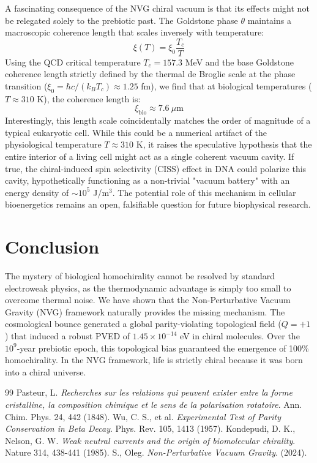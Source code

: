 \documentclass[12pt,a4paper]{article}
\begin{document}
A fascinating consequence of the NVG chiral vacuum is that its effects might not be relegated solely to the prebiotic past. The Goldstone phase $\theta$ maintains a macroscopic coherence length that scales inversely with temperature:
\begin{equation}
    \xi(T) = \xi_0 \frac{T_c}{T}
\end{equation}
Using the QCD critical temperature $T_c = 157.3$ MeV and the base Goldstone coherence length strictly defined by the thermal de Broglie scale at the phase transition ($\xi_0 = \hbar c / (k_B T_c) \approx 1.25$ fm), we find that at biological temperatures ($T \approx 310$ K), the coherence length is:
\begin{equation}
    \xi_{\text{bio}} \approx 7.6\ \mu\text{m}
\end{equation}
Interestingly, this length scale coincidentally matches the order of magnitude of a typical eukaryotic cell. While this could be a numerical artifact of the physiological temperature $T \approx 310$ K, it raises the speculative hypothesis that the entire interior of a living cell might act as a single coherent vacuum cavity. If true, the chiral-induced spin selectivity (CISS) effect in DNA could polarize this cavity, hypothetically functioning as a non-trivial "vacuum battery" with an energy density of $\sim 10^5$ J/m$^3$. The potential role of this mechanism in cellular bioenergetics remains an open, falsifiable question for future biophysical research.

\section{Conclusion}

The mystery of biological homochirality cannot be resolved by standard electroweak physics, as the thermodynamic advantage is simply too small to overcome thermal noise. We have shown that the Non-Perturbative Vacuum Gravity (NVG) framework naturally provides the missing mechanism. The cosmological bounce generated a global parity-violating topological field ($Q=+1$) that induced a robust PVED of $1.45 \times 10^{-14}$ eV in chiral molecules. Over the $10^9$-year prebiotic epoch, this topological bias guaranteed the emergence of 100\% homochirality. In the NVG framework, life is strictly chiral because it was born into a chiral universe.

\begin{thebibliography}{99}
 Pasteur, L. \textit{Recherches sur les relations qui peuvent exister entre la forme cristalline, la composition chimique et le sens de la polarisation rotatoire}. Ann. Chim. Phys. 24, 442 (1848).
 Wu, C. S., et al. \textit{Experimental Test of Parity Conservation in Beta Decay}. Phys. Rev. 105, 1413 (1957).
 Kondepudi, D. K., Nelson, G. W. \textit{Weak neutral currents and the origin of biomolecular chirality}. Nature 314, 438-441 (1985).
 S., Oleg. \textit{Non-Perturbative Vacuum Gravity}. (2024).
\end{thebibliography}
\end{document}
